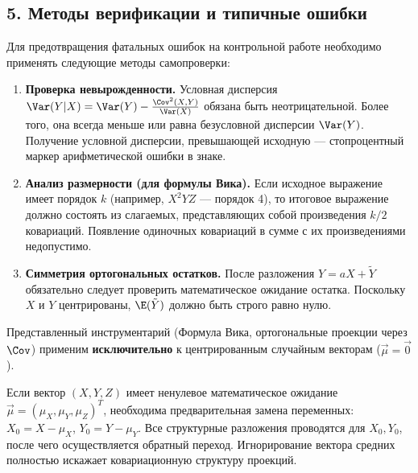 \subsection*{5. Методы верификации и типичные ошибки}

Для предотвращения фатальных ошибок на контрольной работе необходимо применять следующие методы самопроверки:

\begin{enumerate}
    \item \textbf{Проверка невырожденности.} Условная дисперсия $\Var(Y|X) = \Var(Y) - \frac{\Cov^2(X,Y)}{\Var(X)}$ обязана быть неотрицательной. Более того, она всегда меньше или равна безусловной дисперсии $\Var(Y)$. Получение условной дисперсии, превышающей исходную — стопроцентный маркер арифметической ошибки в знаке.
    
    \item \textbf{Анализ размерности (для формулы Вика).} Если исходное выражение имеет порядок $k$ (например, $X^2 Y Z$ — порядок 4), то итоговое выражение должно состоять из слагаемых, представляющих собой произведения $k/2$ ковариаций. Появление одиночных ковариаций в сумме с их произведениями недопустимо.
    
    \item \textbf{Симметрия ортогональных остатков.} После разложения $Y = aX + \tilde{Y}$ обязательно следует проверить математическое ожидание остатка. Поскольку $X$ и $Y$ центрированы, $\E(\tilde{Y})$ должно быть строго равно нулю.
\end{enumerate}

\begin{WarningBox}
Представленный инструментарий (Формула Вика, ортогональные проекции через $\Cov$) применим \textbf{исключительно} к центрированным случайным векторам ($\vec{\mu} = \vec{0}$). 

Если вектор $(X, Y, Z)$ имеет ненулевое математическое ожидание $\vec{\mu} = (\mu_X, \mu_Y, \mu_Z)^T$, необходима предварительная замена переменных: $X_0 = X - \mu_X$, $Y_0 = Y - \mu_Y$. Все структурные разложения проводятся для $X_0, Y_0$, после чего осуществляется обратный переход. Игнорирование вектора средних полностью искажает ковариационную структуру проекций.
\end{WarningBox}
